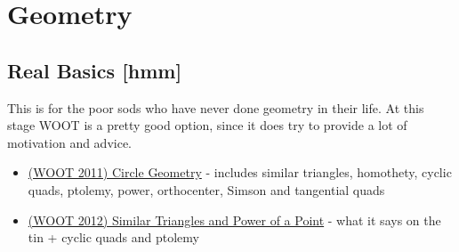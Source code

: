 \section{Geometry}
%
	\subsection{Real Basics [hmm]}
	\noindent This is for the poor sods who have never done geometry in their life. At this stage WOOT is a pretty good option, since it does try to provide a lot of motivation and advice.
	\begin{itemize}
	\item \href{run:./F_Geometry/(WOOT 2011) Circle Geometry.pdf}{(WOOT 2011) Circle Geometry} - includes similar triangles, homothety, cyclic quads, ptolemy, power, orthocenter, Simson and tangential quads
	\item \href{run:./F_Geometry/(WOOT 2012) Similar Triangles and power of a Point.pdf}{(WOOT 2012) Similar Triangles and Power of a Point} - what it says on the tin + cyclic quads and ptolemy
	\end{itemize}
%
